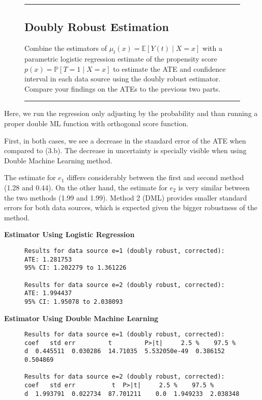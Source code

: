 \documentclass{article}
\newenvironment{colorparagraph}[1]{\par\color{#1}}{\par}
\begin{document}
\begin{figure}[H]
  \begin{colorparagraph}{questioncolor}
  \rule{\textwidth}{0.5pt}
  \label{q3c}
  \subsection{Doubly Robust Estimation}

  Combine the estimators of \( \mu_t(x) = \mathbb{E}[Y(t) \mid X = x] \) with a parametric logistic regression estimate of the propensity score \( p(x) = \mathbb{P}[T = 1 \mid X = x] \) to estimate the ATE and confidence interval in each data source using the doubly robust estimator. Compare your findings on the ATEs to the previous two parts.

  \rule{\textwidth}{0.5pt}
  \end{colorparagraph}
\end{figure}

Here, we run the regression only adjusting by the probability and than running a proper double ML function with orthogonal score function.

First, in both cases, we see a decrease in the standard error of the ATE when compared to (3.b). The decrease in uncertainty is specially visible when using Double Machine Learning method.

The estimate for $e_1$ differs considerably between the first and second method (1.28 and 0.44). On the other hand, the estimate for $e_2$ is very similar between the two methods (1.99 and 1.99). Method 2 (DML) provides smaller standard errors for both data sources, which is expected given the bigger robustness of the method.

\textbf{Estimator Using Logistic Regression}

\begin{figure}[H]
  \begin{lstlisting}[style=RstyleComment, caption=Doubly Robust ATE Estimation]
Results for data source e=1 (doubly robust, corrected):
ATE: 1.281753 
95% CI: 1.202279 to 1.361226 

Results for data source e=2 (doubly robust, corrected):
ATE: 1.994437 
95% CI: 1.95078 to 2.038093 
  \end{lstlisting}
\end{figure}

\textbf{Estimator Using Double Machine Learning}

\begin{figure}[H]
\begin{lstlisting}[style=RstyleComment, caption=Doubly Robust ATE Estimation]
Results for data source e=1 (doubly robust, corrected):
coef   std err         t         P>|t|     2.5 %    97.5 %
d  0.445511  0.030286  14.71035  5.532050e-49  0.386152  0.504869

Results for data source e=2 (doubly robust, corrected):
coef   std err          t  P>|t|     2.5 %    97.5 %
d  1.993791  0.022734  87.701211    0.0  1.949233  2.038348
\end{lstlisting}
\end{figure}
\end{document}
